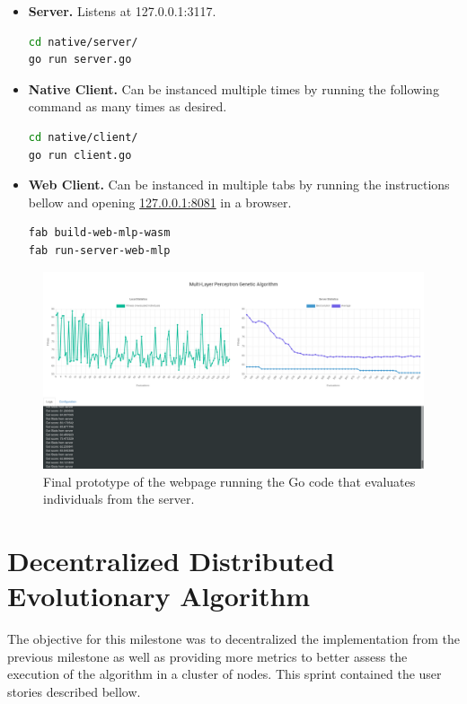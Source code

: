 \begin{itemize}
	\item \textbf{Server.} Listens at 127.0.0.1:3117.
\begin{lstlisting}[language=bash]
cd native/server/
go run server.go
\end{lstlisting}

	\item \textbf{Native Client.} Can be instanced multiple times by running the following command as many times as desired.
\begin{lstlisting}[language=bash]
cd native/client/
go run client.go
\end{lstlisting}

	\item \textbf{Web Client.} Can be instanced in multiple tabs by running the instructions bellow and opening \href{127.0.0.1:8081}{127.0.0.1:8081} in a browser.
\begin{lstlisting}[language=bash]
fab build-web-mlp-wasm
fab run-server-web-mlp
\end{lstlisting}
\end{itemize}

\begin{figure}[h!]
		\centering
    	\includegraphics[width=\linewidth]{assets/images/web-milestone2.png}
    	\caption{Final prototype of the webpage running the Go code that evaluates individuals from the server.}
    	\label{image:web-milestone2}
\end{figure}

\section{Decentralized Distributed Evolutionary Algorithm}

The objective for this milestone was to decentralized the implementation from the previous milestone as well as providing more metrics to better assess the execution of the algorithm in a cluster of nodes. This sprint contained the user stories described bellow.

